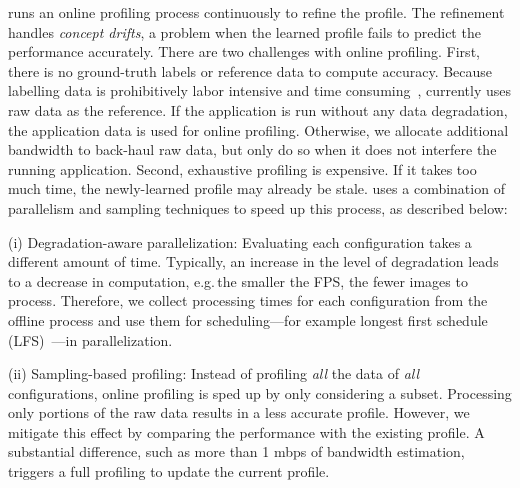  \sysname{} runs an online profiling process
continuously to refine the profile. The refinement handles \textit{concept
  drifts}, a problem when the learned profile fails to predict the performance
accurately. There are two challenges with online profiling.
First, there is no ground-truth labels or reference data to compute
accuracy. Because labelling data is prohibitively labor intensive and time
consuming~\cite{russell2008labelme}, \sysname{} currently uses raw data as the
reference. If the application is run without any data degradation, the
application data is used for online profiling. Otherwise, we allocate additional
bandwidth to back-haul raw data, but only do so when it does not interfere the
running application.
Second, exhaustive profiling is expensive. If it takes too much time,
the newly-learned profile may already be stale. \sysname{} uses a combination of
parallelism and sampling techniques to speed up this process, as described below:

(i) Degradation-aware parallelization: Evaluating each configuration takes a
different amount of time. Typically, an increase in the level of degradation
leads to a decrease in computation, e.g.\,the smaller the FPS, the fewer images
to process. Therefore, we collect processing times for each configuration from
the offline process and use them for scheduling---for example longest first
schedule (LFS)~\cite{karger2010scheduling}---in parallelization.

(ii) Sampling-based profiling: Instead of profiling \textit{all} the data of
\textit{all} configurations, online profiling is sped up by only considering a subset. Processing only portions of the raw data results in a less accurate profile.  However, we mitigate this effect by comparing the performance with the existing profile. A
substantial difference, such as more than 1 mbps of bandwidth estimation,
triggers a full profiling to update the current profile.

